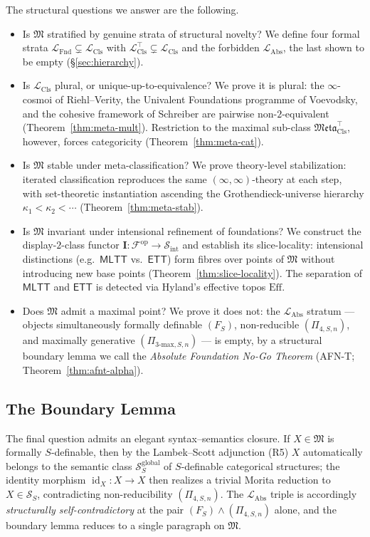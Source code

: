 \documentclass[11pt]{article}
\theoremstyle{plain}
\theoremstyle{definition}
\newcommand{\cS}{\mathcal{S}}
\newcommand{\cF}{\mathcal{F}}
\newcommand{\fM}{\mathfrak{M}}
\newcommand{\Meta}{\mathfrak{Meta}}
\newcommand{\LFnd}{\mathcal{L}_{\mathrm{Fnd}}}
\newcommand{\LCls}{\mathcal{L}_{\mathrm{Cls}}}
\newcommand{\LClsMax}{\mathcal{L}_{\mathrm{Cls}}^{\top}}
\newcommand{\LAbs}{\mathcal{L}_{\mathrm{Abs}}}
\newcommand{\Sint}{\cS_{\mathrm{int}}}
\newcommand{\MLTT}{\mathsf{MLTT}}
\newcommand{\ETT}{\mathsf{ETT}}
\newcommand{\II}{\mathbf{I}}
\DeclareMathOperator{\id}{id}
\begin{document}
The structural questions we answer are the following.
\begin{itemize}
\item Is $\fM$ stratified by genuine strata of structural novelty? We define four formal strata $\LFnd \subsetneq \LCls$ with $\LClsMax \subsetneq \LCls$ and the forbidden $\LAbs$, the last shown to be empty (\S\ref{sec:hierarchy}).
\item Is $\LCls$ plural, or unique-up-to-equivalence? We prove it is plural: the $\infty$-cosmoi of Riehl--Verity, the Univalent Foundations programme of Voevodsky, and the cohesive framework of Schreiber are pairwise non-$2$-equivalent (Theorem~\ref{thm:meta-mult}). Restriction to the maximal sub-class $\Meta_{\mathrm{Cls}}^{\top}$, however, forces categoricity (Theorem~\ref{thm:meta-cat}).
\item Is $\fM$ stable under meta-classification? We prove theory-level stabilization: iterated classification reproduces the same $(\infty, \infty)$-theory at each step, with set-theoretic instantiation ascending the Grothendieck-universe hierarchy $\kappa_1 < \kappa_2 < \cdots$ (Theorem~\ref{thm:meta-stab}).
\item Is $\fM$ invariant under intensional refinement of foundations? We construct the display-$2$-class functor $\II : \cF^{\mathrm{op}} \to \Sint$ and establish its slice-locality: intensional distinctions (e.g.\ $\MLTT$ vs.\ $\ETT$) form fibres over points of $\fM$ without introducing new base points (Theorem~\ref{thm:slice-locality}). The separation of $\MLTT$ and $\ETT$ is detected via Hyland's effective topos $\mathrm{Eff}$.
\item Does $\fM$ admit a maximal point? We prove it does not: the $\LAbs$ stratum --- objects simultaneously formally definable $(F_S)$, non-reducible $(\Pi_{4, S, n})$, and maximally generative $(\Pi_{3\text{-max}, S, n})$ --- is empty, by a structural boundary lemma we call the \emph{Absolute Foundation No-Go Theorem} (AFN-T; Theorem~\ref{thm:afnt-alpha}).
\end{itemize}

\subsection{The Boundary Lemma}

The final question admits an elegant syntax--semantics closure. If $X \in \fM$ is formally $S$-definable, then by the Lambek--Scott adjunction (R5) $X$ automatically belongs to the semantic class $\cS_S^{\mathrm{global}}$ of $S$-definable categorical structures; the identity morphism $\id_X : X \to X$ then realizes a trivial Morita reduction to $X \in \cS_S$, contradicting non-reducibility $(\Pi_{4, S, n})$. The $\LAbs$ triple is accordingly \emph{structurally self-contradictory} at the pair $(F_S) \wedge (\Pi_{4, S, n})$ alone, and the boundary lemma reduces to a single paragraph on $\fM$.
\end{document}
